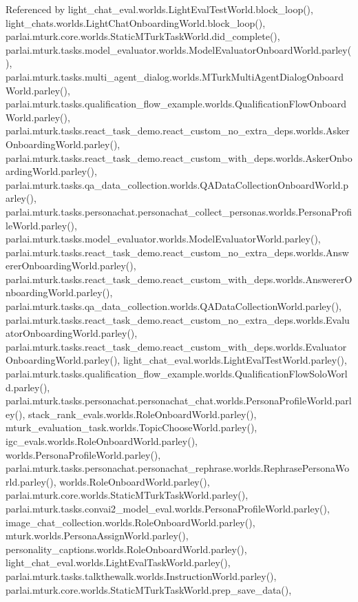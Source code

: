 Referenced by light\+\_\+chat\+\_\+eval.\+worlds.\+Light\+Eval\+Test\+World.\+block\+\_\+loop(), light\+\_\+chats.\+worlds.\+Light\+Chat\+Onboarding\+World.\+block\+\_\+loop(), parlai.\+mturk.\+core.\+worlds.\+Static\+M\+Turk\+Task\+World.\+did\+\_\+complete(), parlai.\+mturk.\+tasks.\+model\+\_\+evaluator.\+worlds.\+Model\+Evaluator\+Onboard\+World.\+parley(), parlai.\+mturk.\+tasks.\+multi\+\_\+agent\+\_\+dialog.\+worlds.\+M\+Turk\+Multi\+Agent\+Dialog\+Onboard\+World.\+parley(), parlai.\+mturk.\+tasks.\+qualification\+\_\+flow\+\_\+example.\+worlds.\+Qualification\+Flow\+Onboard\+World.\+parley(), parlai.\+mturk.\+tasks.\+react\+\_\+task\+\_\+demo.\+react\+\_\+custom\+\_\+no\+\_\+extra\+\_\+deps.\+worlds.\+Asker\+Onboarding\+World.\+parley(), parlai.\+mturk.\+tasks.\+react\+\_\+task\+\_\+demo.\+react\+\_\+custom\+\_\+with\+\_\+deps.\+worlds.\+Asker\+Onboarding\+World.\+parley(), parlai.\+mturk.\+tasks.\+qa\+\_\+data\+\_\+collection.\+worlds.\+Q\+A\+Data\+Collection\+Onboard\+World.\+parley(), parlai.\+mturk.\+tasks.\+personachat.\+personachat\+\_\+collect\+\_\+personas.\+worlds.\+Persona\+Profile\+World.\+parley(), parlai.\+mturk.\+tasks.\+model\+\_\+evaluator.\+worlds.\+Model\+Evaluator\+World.\+parley(), parlai.\+mturk.\+tasks.\+react\+\_\+task\+\_\+demo.\+react\+\_\+custom\+\_\+no\+\_\+extra\+\_\+deps.\+worlds.\+Answerer\+Onboarding\+World.\+parley(), parlai.\+mturk.\+tasks.\+react\+\_\+task\+\_\+demo.\+react\+\_\+custom\+\_\+with\+\_\+deps.\+worlds.\+Answerer\+Onboarding\+World.\+parley(), parlai.\+mturk.\+tasks.\+qa\+\_\+data\+\_\+collection.\+worlds.\+Q\+A\+Data\+Collection\+World.\+parley(), parlai.\+mturk.\+tasks.\+react\+\_\+task\+\_\+demo.\+react\+\_\+custom\+\_\+no\+\_\+extra\+\_\+deps.\+worlds.\+Evaluator\+Onboarding\+World.\+parley(), parlai.\+mturk.\+tasks.\+react\+\_\+task\+\_\+demo.\+react\+\_\+custom\+\_\+with\+\_\+deps.\+worlds.\+Evaluator\+Onboarding\+World.\+parley(), light\+\_\+chat\+\_\+eval.\+worlds.\+Light\+Eval\+Test\+World.\+parley(), parlai.\+mturk.\+tasks.\+qualification\+\_\+flow\+\_\+example.\+worlds.\+Qualification\+Flow\+Solo\+World.\+parley(), parlai.\+mturk.\+tasks.\+personachat.\+personachat\+\_\+chat.\+worlds.\+Persona\+Profile\+World.\+parley(), stack\+\_\+rank\+\_\+evals.\+worlds.\+Role\+Onboard\+World.\+parley(), mturk\+\_\+evaluation\+\_\+task.\+worlds.\+Topic\+Choose\+World.\+parley(), igc\+\_\+evals.\+worlds.\+Role\+Onboard\+World.\+parley(), worlds.\+Persona\+Profile\+World.\+parley(), parlai.\+mturk.\+tasks.\+personachat.\+personachat\+\_\+rephrase.\+worlds.\+Rephrase\+Persona\+World.\+parley(), worlds.\+Role\+Onboard\+World.\+parley(), parlai.\+mturk.\+core.\+worlds.\+Static\+M\+Turk\+Task\+World.\+parley(), parlai.\+mturk.\+tasks.\+convai2\+\_\+model\+\_\+eval.\+worlds.\+Persona\+Profile\+World.\+parley(), image\+\_\+chat\+\_\+collection.\+worlds.\+Role\+Onboard\+World.\+parley(), mturk.\+worlds.\+Persona\+Assign\+World.\+parley(), personality\+\_\+captions.\+worlds.\+Role\+Onboard\+World.\+parley(), light\+\_\+chat\+\_\+eval.\+worlds.\+Light\+Eval\+Task\+World.\+parley(), parlai.\+mturk.\+tasks.\+talkthewalk.\+worlds.\+Instruction\+World.\+parley(), parlai.\+mturk.\+core.\+worlds.\+Static\+M\+Turk\+Task\+World.\+prep\+\_\+save\+\_\+data(), 